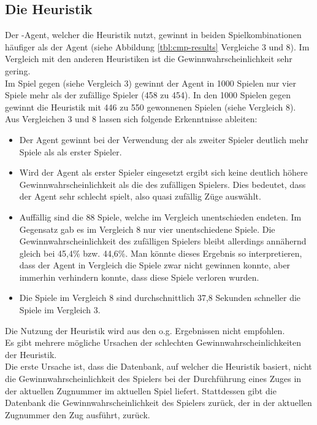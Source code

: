 \subsection{Die Heuristik }
\label{fz:h_smc}
Der -Agent, welcher die  Heuristik nutzt, gewinnt in beiden Spielkombinationen häufiger als der  Agent (siehe Abbildung \ref{tbl:cmp-results} Vergleiche 3 und 8). Im Vergleich mit den anderen Heuristiken ist die Gewinnwahrscheinlichkeit sehr gering.
\\Im Spiel  gegen  (siehe Vergleich 3) gewinnt der Agent in 1000 Spielen nur vier Spiele mehr als der zufällige Spieler (458 zu 454). In den 1000 Spielen  gegen  gewinnt die Heuristik mit 446 zu 550 gewonnenen Spielen (siehe Vergleich 8).
\\Aus Vergleichen 3 und 8 lassen sich folgende Erkenntnisse ableiten:
\begin{itemize}
\item Der Agent  gewinnt bei der Verwendung der  als zweiter Spieler deutlich mehr Spiele als als erster Spieler.
\item Wird der Agent als erster Spieler eingesetzt ergibt sich keine deutlich höhere Gewinnwahrscheinlichkeit als die des zufälligen Spielers. Dies bedeutet, dass der Agent sehr schlecht spielt, also quasi zufällig Züge auswählt. 
\item Auffällig sind die 88 Spiele, welche im Vergleich unentschieden endeten. Im Gegensatz gab es im Vergleich 8 nur vier unentschiedene Spiele. Die Gewinnwahrscheinlichkeit des zufälligen Spielers bleibt allerdings annähernd gleich bei 45,4\% bzw. 44,6\%. Man könnte dieses Ergebnis so interpretieren, dass der Agent in Vergleich die Spiele zwar nicht gewinnen konnte, aber immerhin verhindern konnte, dass diese Spiele verloren wurden.
\item Die Spiele im Vergleich 8 sind durchschnittlich 37,8 Sekunden schneller die Spiele im Vergleich 3.
\end{itemize}
Die Nutzung der Heuristik  wird aus den o.g. Ergebnissen nicht empfohlen.
\\Es gibt mehrere mögliche Ursachen der schlechten Gewinnwahrscheinlichkeiten der Heuristik.
\vspace{0.5cm}
\\Die erste Ursache ist, dass die Datenbank, auf welcher die Heuristik basiert, nicht die Gewinnwahrscheinlichkeit des Spielers bei der Durchführung eines Zuges in der aktuellen Zugnummer im aktuellen Spiel liefert. Stattdessen gibt die Datenbank die Gewinnwahrscheinlichkeit des Spielers zurück, der in der aktuellen Zugnummer den Zug ausführt, zurück.
